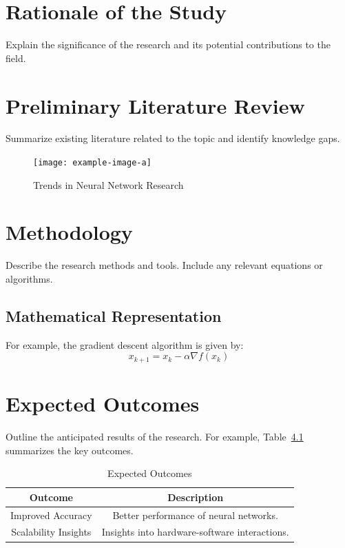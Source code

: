 \documentclass[12pt, a4paper]{report}
\begin{document}
\chapter{Rationale of the Study}
Explain the significance of the research and its potential contributions to the field.

\chapter{Preliminary Literature Review}
Summarize existing literature related to the topic and identify knowledge gaps.

\begin{figure}[h!]
    \centering
    \texttt{[image: example-image-a]} %
    \caption{Trends in Neural Network Research}
    \label{fig:neural_trends}
\end{figure}

\chapter{Methodology}
Describe the research methods and tools. Include any relevant equations or algorithms.

\section{Mathematical Representation}
For example, the gradient descent algorithm is given by:
\begin{equation}
    x_{k+1} = x_k - \alpha \nabla f(x_k)
    \label{eq:gradient_descent}
\end{equation}

\chapter{Expected Outcomes}
Outline the anticipated results of the research. For example, Table~\ref{tab:expected_outcomes} summarizes the key outcomes.

\begin{table}[h!]
    \caption{Expected Outcomes}
    \centering
    \begin{tabular}{|c|c|}
        \hline
        Outcome & Description \\ \hline
        Improved Accuracy & Better performance of neural networks. \\ \hline
        Scalability Insights & Insights into hardware-software interactions. \\ \hline
    \end{tabular}
    \label{tab:expected_outcomes}
\end{table}
\end{document}
